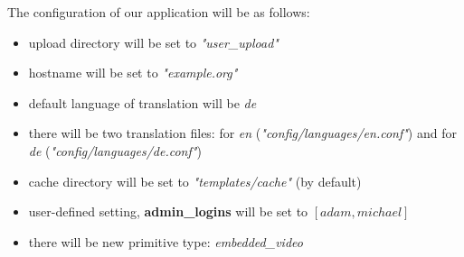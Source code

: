 The configuration of our application will be as follows:
\begin{itemize}
\item upload directory will be set to {\it "user\_upload"}
\item hostname will be set to {\it "example.org"}
\item default language of translation will be {\it de}
\item there will be two translation files: for {\it en} ({\it "config/languages/en.conf"}) and for {\it de} ({\it "config/languages/de.conf"})
\item cache directory will be set to {\it "templates/cache"} (by default)
\item user-defined setting, {\bf admin\_logins} will be set to {\it $\left[ adam, michael \right]$}
\item there will be new primitive type: {\it embedded\_video}
\end{itemize}
